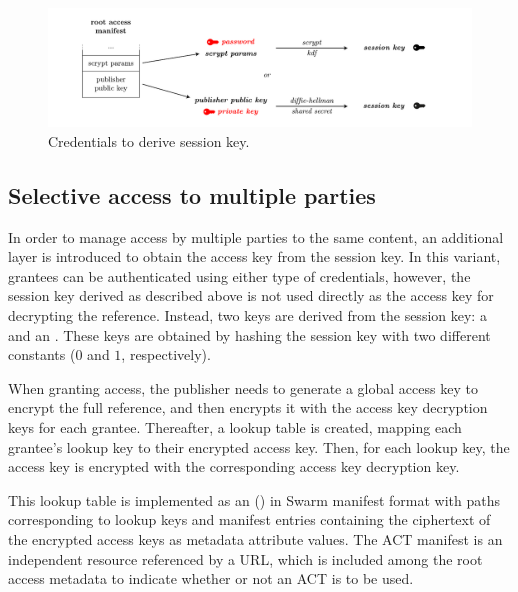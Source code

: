 \begin{figure}[htbp]
\centering
\includegraphics[width=\textwidth]{fig/credentials-to-derive-session-key.pdf}
\caption[Credentials to derive session key  \statusyellow]{Credentials to derive session key.}
\label{fig:credentials-to-derive-session-key}
\end{figure}


\subsection{Selective access to multiple parties\statusgreen}

In order to manage access by multiple parties to the same content, an additional layer is introduced to obtain the access key from the session key. In this variant, grantees can be authenticated using either type of credentials, however, the session key derived as
described above is not used directly as the access key for decrypting the reference. Instead, two keys are derived from the session key: a  and an . These keys are obtained by hashing the session key with two different constants ($0$ and $1$, respectively).

When granting access, the publisher needs to generate a global access key to encrypt the full reference, and then encrypts it with the
access key decryption keys for each grantee. Thereafter, a lookup table is created, mapping each grantee's lookup key to their encrypted access key. Then, for each lookup key, the access key is encrypted with the corresponding access key decryption key.

This lookup table is implemented as an  () in Swarm manifest format with paths corresponding to lookup keys and manifest entries containing the ciphertext of the encrypted access keys as metadata attribute values. The ACT manifest is an independent resource referenced by a URL, which is included among the root access metadata to indicate whether or not an ACT is to be used.

